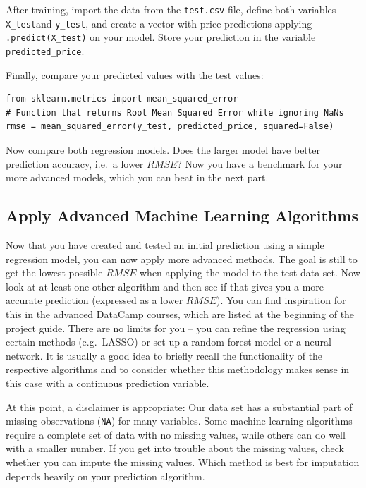 \documentclass[
  11pt,
]{article}
\newenvironment{tipsp}[1]
  {
  \begin{itemize}
  \footnotesize
  \renewcommand{\labelitemi}{
    \raisebox{-.7\height}[0pt][0pt]{
      {\setkeys{Gin}{width=3em,keepaspectratio}
        \texttt{[image: images/\#1.png]}}
    }
  }
  \setlength{\fboxsep}{1em}
  \begin{pbox}
  \item
  }
  {
  \end{pbox}
  \end{itemize}
  }
\begin{document}
\begin{tipsp}p

After training, import the data from the \texttt{test.csv} file, define both variables \texttt{X\_test}and \texttt{y\_test}, and create a vector with price predictions applying \texttt{.predict(X\_test)} on your model. Store your prediction in the variable \texttt{predicted\_price}.

Finally, compare your predicted values with the test values:

\begin{verbatim}
from sklearn.metrics import mean_squared_error
# Function that returns Root Mean Squared Error while ignoring NaNs
rmse = mean_squared_error(y_test, predicted_price, squared=False)
\end{verbatim}


\end{tipsp}

Now compare both regression models. Does the larger model have better prediction accuracy, i.e.~a lower \(RMSE\)? Now you have a benchmark for your more advanced models, which you can beat in the next part.

\hypertarget{apply-advanced-machine-learning-algorithms}{%
\subsection{Apply Advanced Machine Learning Algorithms}\label{apply-advanced-machine-learning-algorithms}}

Now that you have created and tested an initial prediction using a simple regression model, you can now apply more advanced methods. The goal is still to get the lowest possible \(RMSE\) when applying the model to the test data set. Now look at at least one other algorithm and then see if that gives you a more accurate prediction (expressed as a lower \(RMSE\)). You can find inspiration for this in the advanced DataCamp courses, which are listed at the beginning of the project guide. There are no limits for you -- you can refine the regression using certain methods (e.g.~LASSO) or set up a random forest model or a neural network. It is usually a good idea to briefly recall the functionality of the respective algorithms and to consider whether this methodology makes sense in this case with a continuous prediction variable.

At this point, a disclaimer is appropriate: Our data set has a substantial part of missing observations (\texttt{NA}) for many variables. Some machine learning algorithms require a complete set of data with no missing values, while others can do well with a smaller number. If you get into trouble about the missing values, check whether you can impute the missing values. Which method is best for imputation depends heavily on your prediction algorithm.
\end{document}
